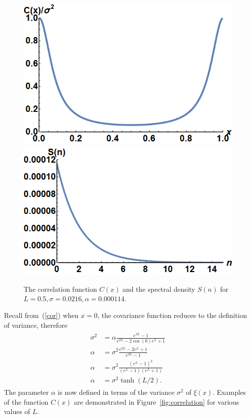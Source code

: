 \begin{figure}[htp]
\caption[Schematic example of the covariance-spectrum pair]{The correlation function
  $C(x)$ and the spectral density $S(n)$ for $L=0.5,\sigma=0.0216, \alpha=0.000114$.}\label{fig:covspec}
\centering
\includegraphics[width=.45\textwidth]{figs/cx.png}\hfill
\includegraphics[width=.45\textwidth]{figs/sn.png}
\end{figure}
Recall from~(\ref{cor}) when $x=0$, the covariance function reduces to the definition
of variance, therefore
\begin{align}
\begin{split}\label{a}
\sigma^2&= \alpha \frac{e^{2L}-1}{e^{2L}-2\cos(0)e^L+1}\\
\alpha &=\sigma^2 \frac{e^{2L}-2e^{L} +1}{e^{2L}-1}\\
\alpha &=\sigma^2
\frac{(e^{L}-1)^2}{(e^{L}-1)(e^{L}+1)}\\
\alpha &= \sigma^2 \tanh(L/2).
\end{split}
\end{align}
The parameter $\alpha$ is now defined in terms of the variance
$\sigma^2$ of $\xi(x)$. Examples of the function $C(x)$ are demonstrated in Figure~\ref{fig:correlation}
for various values of $L$.
